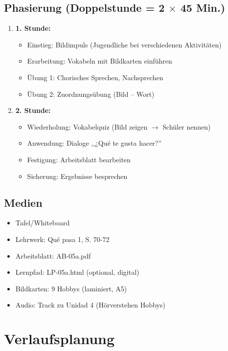 \documentclass[11pt,a4paper]{article}
\newcommand{\lehrwerk}{Qué pasa 1}
\newcommand{\lehrwerkseite}{S. 70-72}
\begin{document}
\subsection{Phasierung (Doppelstunde = 2 $\times$ 45 Min.)}
\begin{enumerate}
    \item \textbf{1. Stunde:}
    \begin{itemize}
        \item Einstieg: Bildimpuls (Jugendliche bei verschiedenen Aktivitäten)
        \item Erarbeitung: Vokabeln mit Bildkarten einführen
        \item Übung 1: Chorisches Sprechen, Nachsprechen
        \item Übung 2: Zuordnungsübung (Bild -- Wort)
    \end{itemize}
    \item \textbf{2. Stunde:}
    \begin{itemize}
        \item Wiederholung: Vokabelquiz (Bild zeigen $\rightarrow$ Schüler nennen)
        \item Anwendung: Dialoge ,,¿Qué te gusta hacer?''
        \item Festigung: Arbeitsblatt bearbeiten
        \item Sicherung: Ergebnisse besprechen
    \end{itemize}
\end{enumerate}

\subsection{Medien}
\begin{itemize}
    \item Tafel/Whiteboard
    \item Lehrwerk: \lehrwerk, \lehrwerkseite
    \item Arbeitsblatt: AB-05a.pdf
    \item Lernpfad: LP-05a.html (optional, digital)
    \item Bildkarten: 9 Hobbys (laminiert, A5)
    \item Audio: Track zu Unidad 4 (Hörverstehen Hobbys)
\end{itemize}

\section{Verlaufsplanung}
\end{document}

